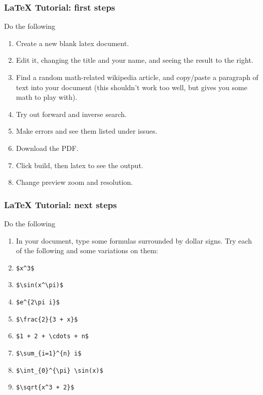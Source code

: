 \documentclass{beamer}
\begin{document}
\begin{frame}
\frametitle{\LaTeX{} Tutorial: first steps}
\begin{block}{Do the following}
\begin{enumerate}
\item Create a new blank latex document.
\item Edit it, changing the title and your name, and seeing the result to the right.
\item Find a random math-related wikipedia article, and copy/paste a paragraph of text into your document (this shouldn't work too well, but gives you some math to play with).
\item Try out forward and inverse search.
\item Make errors and see them listed under issues.
\item Download the PDF.
\item Click build, then latex to see the output.
\item Change preview zoom and resolution.
\end{enumerate}
\end{block}

\end{frame}

\begin{frame}[fragile]
\frametitle{\LaTeX{} Tutorial: next steps}
\begin{block}{Do the following}
\begin{enumerate}
\item In your document, type some formulas surrounded by dollar signs.  Try each of the following and some variations on them:
\item \verb|$x^3$|
\item \verb|$\sin(x^\pi)$|
\item \verb|$e^{2\pi i}$|
\item \verb|$\frac{2}{3 + x}$|
\item \verb|$1 + 2 + \cdots + n$|
\item \verb|$\sum_{i=1}^{n} i$|
\item \verb|$\int_{0}^{\pi} \sin(x)$|
\item \verb|$\sqrt{x^3 + 2}$|
\end{enumerate}
\end{block}
\end{frame}
\end{document}

